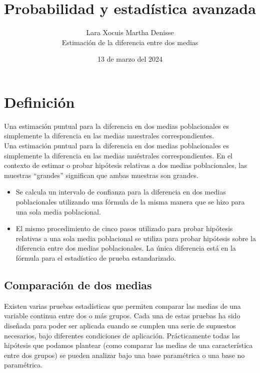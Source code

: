 \documentclass[letterpaper,12pt]{article}
\title {\textbf{Probabilidad y estadística avanzada}}
\author{Lara Xocuis Martha Denisse \\ Estimación de la diferencia entre dos medias}
\date{13 de marzo del 2024}
\begin{document}
\maketitle
\thispagestyle{empty}
\newpage
\setcounter{page}{1}
\pagestyle{headings}

\begin{sloppypar} 

\section{Definición}
Una estimación puntual para la diferencia en dos medias poblacionales es simplemente la diferencia en las medias muestrales correspondientes.
\vspace{0.3cm}\\ 
Una estimación puntual para la diferencia en dos medias poblacionales es simplemente la diferencia en las medias muéstrales correspondientes. En el contexto de estimar o probar hipótesis relativas a dos medias poblacionales, las muestras “grandes” significan que ambas muestras son grandes.

\begin{itemize}
    \item Se calcula un intervalo de confianza para la diferencia en dos medias poblacionales utilizando una fórmula de la misma manera que se hizo para una sola media poblacional.
    \item El mismo procedimiento de cinco pasos utilizado para probar hipótesis relativas a una sola media poblacional se utiliza para probar hipótesis sobre la diferencia entre dos medias poblacionales. La única diferencia está en la fórmula para el estadístico de prueba estandarizado.
\end{itemize}

\subsection{Comparación de dos medias}
Existen varias pruebas estadísticas que permiten comparar las medias de una variable continua entre dos o más grupos. Cada una de estas pruebas ha sido diseñada para poder ser aplicada cuando se cumplen una serie de supuestos necesarios, bajo diferentes condiciones de aplicación. Prácticamente todas las hipótesis que podamos plantear (como comparar las medias de una característica entre dos grupos) se pueden analizar bajo una base paramétrica o una base no paramétrica.


\end{sloppypar}
\end{document}

